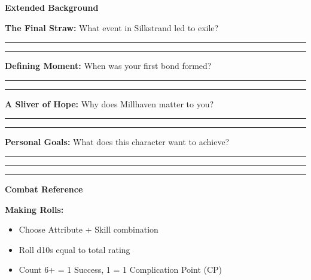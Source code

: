 \documentclass[10pt]{article}
\begin{document}
\begin{mdframed}[backgroundcolor=background, linewidth=0pt, roundcorner=5pt]
\vspace{0.2cm}

\begin{mdframed}[backgroundcolor=sectionbg, linewidth=1pt, linecolor=accentcolor, roundcorner=3pt]
\textbf{\large Extended Background}
\end{mdframed}

\begin{adjustwidth}{0.2cm}{0.2cm}
\vspace{0.2cm}
\textbf{The Final Straw:} What event in Silkstrand led to exile? \\
\rule{\textwidth-0.4cm}{0.4pt}
\rule{\textwidth-0.4cm}{0.4pt}

\vspace{0.3cm}
\textbf{Defining Moment:} When was your first bond formed? \\
\rule{\textwidth-0.4cm}{0.4pt}
\rule{\textwidth-0.4cm}{0.4pt}

\vspace{0.3cm}
\textbf{A Sliver of Hope:} Why does Millhaven matter to you? \\
\rule{\textwidth-0.4cm}{0.4pt}
\rule{\textwidth-0.4cm}{0.4pt}

\vspace{0.3cm}
\textbf{Personal Goals:} What does this character want to achieve? \\
\rule{\textwidth-0.4cm}{0.4pt}
\rule{\textwidth-0.4cm}{0.4pt}
\rule{\textwidth-0.4cm}{0.4pt}
\end{adjustwidth}

\vspace{0.3cm}

\begin{mdframed}[backgroundcolor=sectionbg, linewidth=1pt, linecolor=accentcolor, roundcorner=3pt]
\textbf{\large Combat Reference}
\end{mdframed}

\begin{adjustwidth}{0.2cm}{0.2cm}
\vspace{0.2cm}
\textbf{Making Rolls:}
\begin{itemize}[leftmargin=*]
\item Choose Attribute + Skill combination
\item Roll d10s equal to total rating
\item Count 6+ = 1 Success, 1 = 1 Complication Point (CP)
\end{itemize}


\end{adjustwidth}
\end{mdframed}
\end{document}
